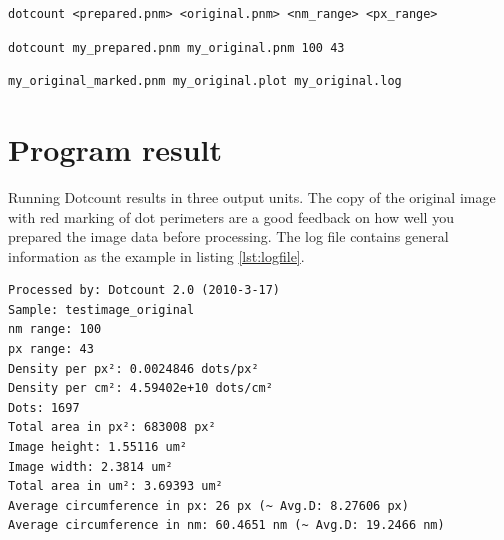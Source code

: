 \documentclass[a4paper,10pt]{book}
\begin{document}
\begin{lstlisting}[caption={Dotcount usage}, label=lst:dotcountcmd]
dotcount <prepared.pnm> <original.pnm> <nm_range> <px_range>
\end{lstlisting}

\begin{lstlisting}[caption={Dotcount example}, label=lst:dotcountex]
dotcount my_prepared.pnm my_original.pnm 100 43
\end{lstlisting}

\begin{lstlisting}[caption={Output from listing \ref{lst:dotcountex} example},
label=lst:outfiles]
my_original_marked.pnm my_original.plot my_original.log
\end{lstlisting}

\chapter{Program result}
\label{chap:result}
Running Dotcount results in three output units. The copy of the original image
with red marking of dot perimeters are a good feedback on how well you prepared
the image data before processing. The log file contains general information as
the example in listing \ref{lst:logfile}.

\begin{lstlisting}[caption={Reported logfile}, label=lst:logfile]
Processed by: Dotcount 2.0 (2010-3-17)
Sample: testimage_original
nm range: 100
px range: 43
Density per px²: 0.0024846 dots/px²
Density per cm²: 4.59402e+10 dots/cm²
Dots: 1697
Total area in px²: 683008 px²
Image height: 1.55116 um²
Image width: 2.3814 um²
Total area in um²: 3.69393 um²
Average circumference in px: 26 px (~ Avg.D: 8.27606 px)
Average circumference in nm: 60.4651 nm (~ Avg.D: 19.2466 nm)
\end{lstlisting}
\end{document}
